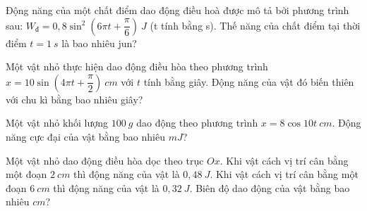 \setcounter{ex}{0}
\PhanIII
\begin{ex}
Động năng của một chất điểm dao động điều hoà được mô tả bởi phương trình sau: $W_{\text{đ}}=0,8 \sin ^2\left(6 \pi t+\dfrac{\pi}{6}\right)\ J$ (t tính bằng s). Thế năng của chất điểm tại thời điểm $t=1 \ s$ là bao nhiêu jun?
\end{ex} 
\begin{ex}
Một vật nhỏ thực hiện dao động điều hòa theo phương trình $x=10 \sin \left(4 \pi t+\dfrac{\pi}{2}\right)\ cm$ với $t$ tính bằng giây. Động năng của vật đó biến thiên với chu kì bằng bao nhiêu giây?
\end{ex} 
\begin{ex}
Một vật nhỏ khối lượng $100 \ g$ dao động theo phương trình $x=8 \cos 10 t\ cm$. Động năng cực đại của vật bằng bao nhiêu $m J$?
\end{ex} 
\begin{ex}
Một vật nhỏ dao động điều hòa dọc theo trục $O x$. Khi vật cách vị trí cân bằng một đoạn $2 \ cm$ thì động năng của vật là $0,48 \ J$. Khi vật cách vị trí cân bằng một đoạn $6 \ cm$ thì động năng của vật là $0,32 \ J$. Biên độ dao động của vật bằng bao nhiêu $cm$?
\end{ex} 
\begin{ex} %
\end{ex} 
